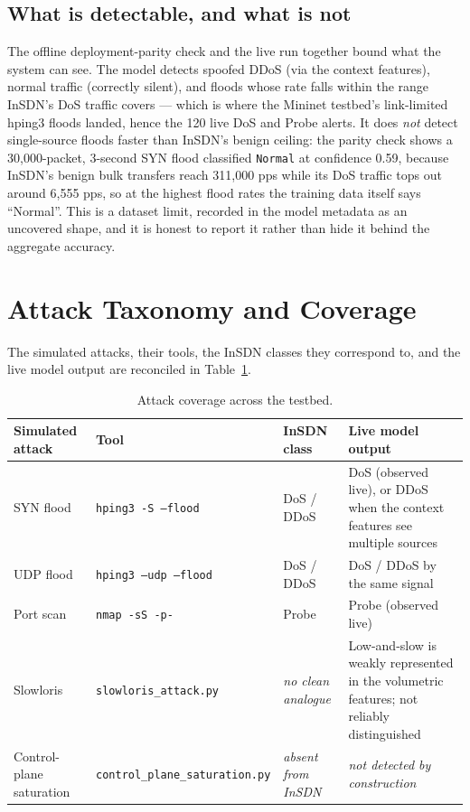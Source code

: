 \documentclass[11pt]{article}
\begin{document}
\subsection{What is detectable, and what is not}
The offline deployment-parity check and the live run together bound what the system can
see. The model detects spoofed DDoS (via the context features), normal traffic (correctly
silent), and floods whose rate falls within the range InSDN's DoS traffic covers --- which
is where the Mininet testbed's link-limited hping3 floods landed, hence the 120 live DoS
and Probe alerts. It does \emph{not} detect single-source floods faster than InSDN's
benign ceiling: the parity check shows a 30{,}000-packet, 3-second SYN flood classified
\texttt{Normal} at confidence 0.59, because InSDN's benign bulk transfers reach 311{,}000
pps while its DoS traffic tops out around 6{,}555 pps, so at the highest flood rates the
training data itself says ``Normal''. This is a dataset limit, recorded in the model
metadata as an uncovered shape, and it is honest to report it rather than hide it behind
the aggregate accuracy.

\section{Attack Taxonomy and Coverage}
The simulated attacks, their tools, the InSDN classes they correspond to, and the live
model output are reconciled in Table~\ref{tab:taxonomy}.

\begin{table}[h]
\centering
\caption{Attack coverage across the testbed.}
\label{tab:taxonomy}
\small
\begin{tabular}{p{2.9cm}p{2.6cm}p{2.3cm}p{5.0cm}}
\toprule
Simulated attack & Tool & InSDN class & Live model output \\
\midrule
SYN flood & \texttt{hping3 -S --flood} & DoS / DDoS & DoS (observed live), or DDoS when the
context features see multiple sources \\
UDP flood & \texttt{hping3 --udp --flood} & DoS / DDoS & DoS / DDoS by the same signal \\
Port scan & \texttt{nmap -sS -p-} & Probe & Probe (observed live) \\
Slowloris & \texttt{slowloris\_attack.py} & \emph{no clean analogue} & Low-and-slow is
weakly represented in the volumetric features; not reliably distinguished \\
Control-plane saturation & \texttt{control\_plane\_saturation.py} & \emph{absent from
InSDN} & \emph{not detected by construction} \\
\bottomrule
\end{tabular}
\end{table}
\end{document}
